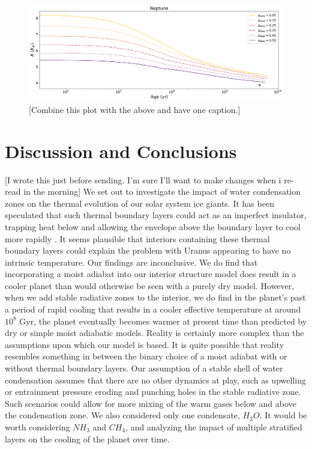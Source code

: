 \documentclass[11pt]{ucscthesisbs}
\begin{document}
\begin{figure}[ht]
 \centerline{
  \includegraphics[scale=0.45]{figures/n_cooling_radius_nz_4096_logx.png}
 }
\caption[Thermal Evolution Curves for Neptune - Radius]
{[Combine this plot with the above and have one caption.] }
\label{fig:evolve_neptune_radius}
\end{figure}



\chapter{Discussion and Conclusions}
[I wrote this just before sending. I'm sure I'll want to make changes when i re-read in the morning]
We set out to investigate the impact of water condensation zones on the thermal evolution of our solar system ice giants. It has been speculated that such thermal boundary layers could act as an imperfect insulator, trapping heat below and allowing the envelope above the boundary layer to cool more rapidly \citep{nettelmann_2016}\citep{friedson_2017}\citep{leconte_2017}\citep{podolak_1991}\citep{scheibe_2019}. It seems plausible that interiors containing these thermal boundary layers could explain the problem with Uranus appearing to have no intrinsic temperature. Our findings are inconclusive. We do find that incorporating a moist adiabat into our interior structure model does result in a cooler planet than would otherwise be seen with a purely dry model. However, when we add stable radiative zones to the interior, we do find in the planet's past a period of rapid cooling that results in a cooler effective temperature at around $10^8$ Gyr, the planet eventually becomes warmer at present time than predicted by dry or simple moist adiabatic models. Reality is certainly more complex than the assumptions upon which our model is based. It is quite possible that reality resembles something in between the binary choice of a moist adiabat with or without thermal boundary layers\citep{guillot_2019}. Our assumption of a stable shell of water condensation assumes that there are no other dynamics at play, such as upwelling or entrainment pressure \citep{friedson_2017} eroding and punching holes in the stable radiative zone. Such scenarios could allow for more mixing of the warm gases below and above the condensation zone. We also considered only one condensate, $H_{2}O$. It would be worth considering $NH_{3}$ and $CH_{4}$, and analyzing the impact of multiple stratified layers on the cooling of the planet over time.





\newcommand{\newblock}{}

\end{document}
